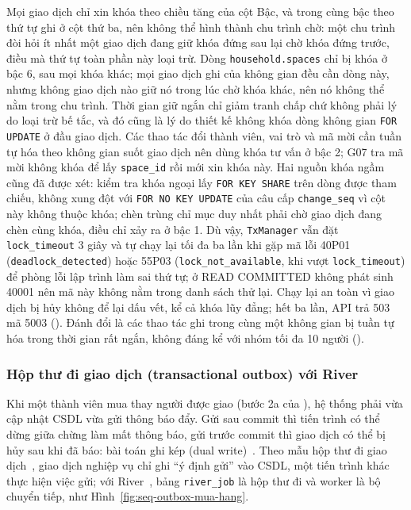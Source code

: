 Mọi giao dịch chỉ xin khóa theo chiều tăng của cột Bậc, và trong cùng bậc theo thứ tự ghi ở cột thứ ba, nên không thể hình thành chu trình chờ: một chu trình đòi hỏi ít nhất một giao dịch đang giữ khóa đứng sau lại chờ khóa đứng trước, điều mà thứ tự toàn phần này loại trừ. Dòng \texttt{household.spaces} chỉ bị khóa ở bậc 6, sau mọi khóa khác; mọi giao dịch ghi của không gian đều cần dòng này, nhưng không giao dịch nào giữ nó trong lúc chờ khóa khác, nên nó không thể nằm trong chu trình. Thời gian giữ ngắn chỉ giảm tranh chấp chứ không phải lý do loại trừ bế tắc, và đó cũng là lý do thiết kế không khóa dòng không gian \texttt{FOR UPDATE} ở đầu giao dịch. Các thao tác đổi thành viên, vai trò và mã mời cần tuần tự hóa theo không gian suốt giao dịch nên dùng khóa tư vấn ở bậc 2; G07 tra mã mời không khóa để lấy \texttt{space\_id} rồi mới xin khóa này. Hai nguồn khóa ngầm cũng đã được xét: kiểm tra khóa ngoại lấy \texttt{FOR KEY SHARE} trên dòng được tham chiếu, không xung đột với \texttt{FOR NO KEY UPDATE} của câu cấp \texttt{change\_seq} vì cột này không thuộc khóa; chèn trùng chỉ mục duy nhất phải chờ giao dịch đang chèn cùng khóa, điều chỉ xảy ra ở bậc 1. Dù vậy, \texttt{TxManager} vẫn đặt \texttt{lock\_timeout} 3 giây và tự chạy lại tối đa ba lần khi gặp mã lỗi 40P01 (\texttt{deadlock\_detected}) hoặc 55P03 (\texttt{lock\_not\_available}, khi vượt \texttt{lock\_timeout}) để phòng lỗi lập trình làm sai thứ tự; ở READ COMMITTED không phát sinh 40001 nên mã này không nằm trong danh sách thử lại. Chạy lại an toàn vì giao dịch bị hủy không để lại dấu vết, kể cả khóa lũy đẳng; hết ba lần, API trả 503 mã 5003 (). Đánh đổi là các thao tác ghi trong cùng một không gian bị tuần tự hóa trong thời gian rất ngắn, không đáng kể với nhóm tối đa 10 người ().

\subsubsection{Hộp thư đi giao dịch (transactional outbox) với River}\label{sssec:kt-outbox}

Khi một thành viên mua thay người được giao (bước 2a của ), hệ thống phải vừa cập nhật CSDL vừa gửi thông báo đẩy. Gửi sau commit thì tiến trình có thể dừng giữa chừng làm mất thông báo, gửi trước commit thì giao dịch có thể bị hủy sau khi đã báo: bài toán ghi kép (dual write)~\cite{kleppmann}. Theo mẫu hộp thư đi giao dịch~\cite{richardson}, giao dịch nghiệp vụ chỉ ghi “ý định gửi” vào CSDL, một tiến trình khác thực hiện việc gửi; với River~\cite{river}, bảng \texttt{river\_job} là hộp thư đi và worker là bộ chuyển tiếp, như Hình~\ref{fig:seq-outbox-mua-hang}.

